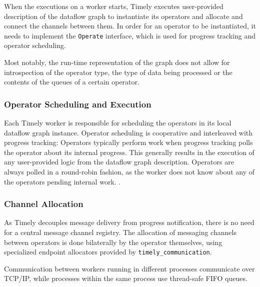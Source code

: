 \begin{addedbar}
When the executions on a worker starts, Timely executes user-provided
description of the dataflow graph to instantiate its operators and allocate
and connect the channels between them. In order for an operator to be
instantiated, it needs to implement the \lstinline{Operate} interface, which
is used for progress tracking and operator scheduling.

Most notably, the run-time representation of the graph does not allow for
introspection of the operator type, the type of data being processed or
the contents of the queues of a certain operator.

\subsubsection{Operator Scheduling and Execution}

Each Timely worker is responsible for scheduling the operators in its local
dataflow graph instance. Operator scheduling is cooperative and interleaved 
with progress tracking: Operators typically perform work when progress tracking
polls the operator about its internal progress. This generally results in the
execution of any user-provided logic from the dataflow graph description.
Operators are always polled in a round-robin fashion, as the worker does
not know about any of the operators pending internal work. .

\subsubsection{Channel Allocation}

As Timely decouples message delivery from progress notification, there is no
need for a central message channel registry. The allocation of messaging
channels between operators is done bilaterally by the operator themselves,
using specialized endpoint allocators provided by \lstinline{timely_communication}.

Communication between workers running in different
processes communicate over TCP/IP, while processes within the same process
use thread-safe FIFO queues.

\end{addedbar}
